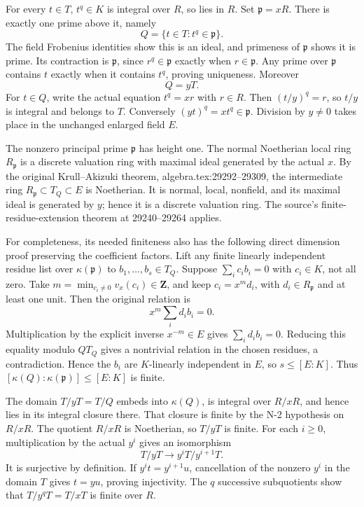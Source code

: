 For every \(t\in T\), \(t^q\in K\) is integral over \(R\), so lies in \(R\). Set \(\mathfrak p=xR\). There is exactly one prime above it, namely \[
 Q=\{t\in T:t^q\in\mathfrak p\}.
\] The field Frobenius identities show this is an ideal, and primeness of \(\mathfrak p\) shows it is prime. Its contraction is \(\mathfrak p\), since \(r^q\in\mathfrak p\) exactly when \(r\in\mathfrak p\). Any prime over \(\mathfrak p\) contains \(t\) exactly when it contains \(t^q\), proving uniqueness. Moreover \[
 Q=yT.
\] For \(t\in Q\), write the actual equation \(t^q=xr\) with \(r\in R\). Then \((t/y)^q=r\), so \(t/y\) is integral and belongs to \(T\). Conversely \((yt)^q=xt^q\in\mathfrak p\). Division by \(y\ne0\) takes place in the unchanged enlarged field \(E\).

The nonzero principal prime \(\mathfrak p\) has height one. The normal Noetherian local ring \(R_{\mathfrak p}\) is a discrete valuation ring with maximal ideal generated by the actual \(x\). By the original Krull--Akizuki theorem, algebra.tex:29292--29309, the intermediate ring \(R_{\mathfrak p}\subset T_Q\subset E\) is Noetherian. It is normal, local, nonfield, and its maximal ideal is generated by \(y\); hence it is a discrete valuation ring. The source's finite-residue-extension theorem at 29240--29264 applies.

For completeness, its needed finiteness also has the following direct dimension proof preserving the coefficient factors. Lift any finite linearly independent residue list over \(\kappa(\mathfrak p)\) to \(b_1,\ldots,b_s\in T_Q\). Suppose \(\sum_i c_i b_i=0\) with \(c_i\in K\), not all zero. Take \(m=\min_{c_i\ne0}v_x(c_i)\in\mathbf Z\), and keep \(c_i=x^m d_i\), with \(d_i\in R_{\mathfrak p}\) and at least one unit. Then the original relation is \[
 x^m\sum_i d_i b_i=0.
\] Multiplication by the explicit inverse \(x^{-m}\in E\) gives \(\sum_i d_i b_i=0\). Reducing this equality modulo \(Q T_Q\) gives a nontrivial relation in the chosen residues, a contradiction. Hence the \(b_i\) are \(K\)-linearly independent in \(E\), so \(s\leq[E:K]\). Thus \([\kappa(Q):\kappa(\mathfrak p)]\leq[E:K]\) is finite.

The domain \(T/yT=T/Q\) embeds into \(\kappa(Q)\), is integral over \(R/xR\), and hence lies in its integral closure there. That closure is finite by the N-2 hypothesis on \(R/xR\). The quotient \(R/xR\) is Noetherian, so \(T/yT\) is finite. For each \(i\geq0\), multiplication by the actual \(y^i\) gives an isomorphism \[
 T/yT\longrightarrow y^iT/y^{i+1}T.
\] It is surjective by definition. If \(y^i t=y^{i+1}u\), cancellation of the nonzero \(y^i\) in the domain \(T\) gives \(t=yu\), proving injectivity. The \(q\) successive subquotients show that \(T/y^qT=T/xT\) is finite over \(R\).

